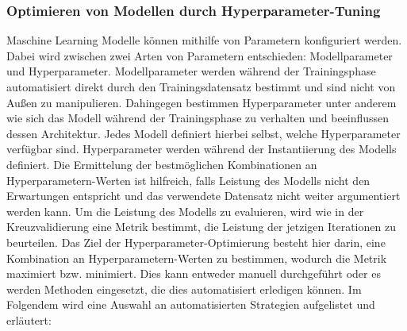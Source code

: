 \pagebreak

\subsubsection*{Optimieren von Modellen durch Hyperparameter-Tuning}\label{hyper_params}
Maschine Learning Modelle können mithilfe von Parametern konfiguriert werden. Dabei wird zwischen zwei Arten von Parametern entschieden: Modellparameter und Hyperparameter.
Modellparameter werden während der Trainingsphase automatisiert direkt durch den Trainingsdatensatz bestimmt und sind nicht von Außen zu manipulieren. Dahingegen bestimmen Hyperparameter unter anderem wie sich das Modell während der Trainingsphase zu verhalten und beeinflussen
dessen Architektur. Jedes Modell definiert hierbei selbst, welche Hyperparameter verfügbar sind. Hyperparameter werden während der Instantiierung des Modells definiert. Die Ermittelung der bestmöglichen Kombinationen an Hyperparametern-Werten ist hilfreich, falls Leistung des Modells nicht den Erwartungen entspricht und das verwendete Datensatz nicht weiter argumentiert werden kann.
Um die Leistung des Modells zu evaluieren, wird wie in der Kreuzvalidierung eine Metrik bestimmt, die Leistung der jetzigen Iterationen zu beurteilen. Das Ziel der Hyperparameter-Optimierung besteht hier darin, eine Kombination an Hyperparametern-Werten zu bestimmen, wodurch die Metrik maximiert bzw. minimiert. 
Dies kann entweder manuell durchgeführt oder es werden Methoden eingesetzt, die dies automatisiert erledigen können. Im Folgendem wird eine Auswahl an automatisierten Strategien aufgelistet und erläutert:


